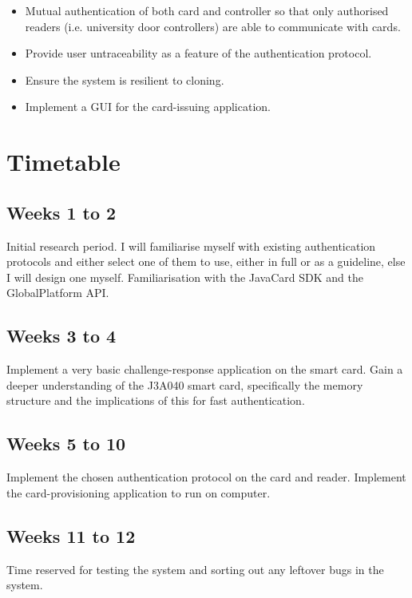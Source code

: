 \documentclass[12pt,a4paper,twoside]{article}
\begin{document}
\begin{itemize}
\item Mutual authentication of both card and controller so that only authorised readers (i.e. university door controllers) are able to communicate with cards.
\item Provide user untraceability as a feature of the authentication protocol.
\item Ensure the system is resilient to cloning.
\item Implement a GUI for the card-issuing application.
\end{itemize}

\section*{Timetable}

\subsection*{Weeks 1 to 2}

Initial research period. I will familiarise myself with existing authentication protocols and either select one of them to use, either in full or as a guideline, else I will design one myself. Familiarisation with the JavaCard SDK and the GlobalPlatform API.

\subsection*{Weeks 3 to 4}

Implement a very basic challenge-response application on the smart card. Gain a deeper understanding of the J3A040 smart card, specifically the memory structure and the implications of this for fast authentication.

\subsection*{Weeks 5 to 10}

Implement the chosen authentication protocol on the card and reader. Implement the card-provisioning application to run on computer.

\subsection*{Weeks 11 to 12}

Time reserved for testing the system and sorting out any leftover bugs in the system.
\end{document}
